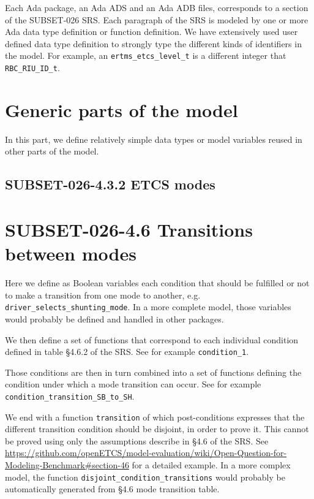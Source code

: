 \documentclass{template/openetcs_report}
\newcommand{\Ada}[1]{\lstinline[language=Ada,basicstyle={\sffamily},framesep=0pt]{#1}}
\begin{document}
Each Ada package, an Ada ADS and an Ada ADB files, corresponds to a
section of the SUBSET-026 SRS. Each paragraph of the SRS is modeled by
one or more Ada data type definition or function definition. We have
extensively used user defined data type definition to strongly type
the different kinds of identifiers in the model. For example, an
\Ada{ertms_etcs_level_t} is a different integer that
\Ada{RBC_RIU_ID_t}.


\section{Generic parts of the model}

In this part, we define relatively simple data types or model
variables reused in other parts of the model.






\subsection{SUBSET-026-4.3.2 ETCS modes}




\section{SUBSET-026-4.6 Transitions between modes}

Here we define as Boolean variables each condition that should be
fulfilled or not to make a transition from one mode to another,
e.g. \Ada{driver_selects_shunting_mode}. In a more complete model,
those variables would probably be defined and handled in other
packages.

We then define a set of functions that correspond to each individual
condition defined in table §4.6.2 of the SRS. See for example
\Ada{condition_1}.

Those conditions are then in turn combined into a set of functions
defining the condition under which a mode transition can occur. See
for example \Ada{condition_transition_SB_to_SH}.

We end with a function \Ada{transition} of which post-conditions
expresses that the different transition condition should be disjoint,
in order to prove it. This cannot be proved using only the assumptions
describe in §4.6 of the SRS. See
\url{https://github.com/openETCS/model-evaluation/wiki/Open-Question-for-Modeling-Benchmark#section-46}
for a detailed example. In a more complex model, the function
\Ada{disjoint_condition_transitions} would probably be automatically
generated from §4.6 mode transition table.
\end{document}

